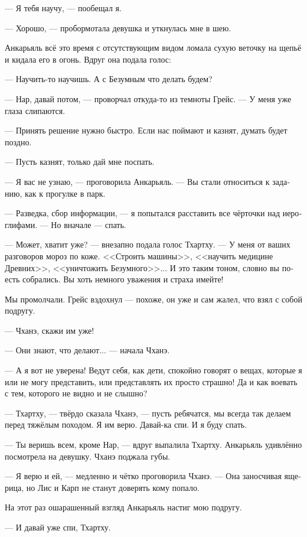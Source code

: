 \documentclass[a4paper,12pt,fleqn]{book}\usepackage{polyglossia}\setdefaultlanguage[babelshorthands=true]{russian}\setotherlanguage{english}\defaultfontfeatures{Ligatures=TeX,Mapping=tex-text}\usepackage{xcolor}\newcommand{\ml}[3]{#2}
\begin{document}
{--- Я тебя научу, --- пообещал я.

--- Хорошо, --- пробормотала девушка и уткнулась мне в шею.

Анкарьяль всё это время с отсутствующим видом ломала сухую веточку на щепьё и кидала его в огонь.
Вдруг она подала голос:

--- Научить-то научишь.
А с Безумным что делать будем?

--- Нар, давай потом, --- проворчал откуда-то из темноты Грейс.
--- У меня уже глаза слипаются.

--- Принять решение нужно быстро.
Если нас поймают и казнят, думать будет поздно.

--- Пусть казнят, только дай мне поспать.

--- Я вас не узнаю, --- проговорила Анкарьяль.
--- Вы стали относиться к заданию, как к прогулке в парк.

--- Разведка, сбор информации, --- я попытался расставить все чёрточки над иероглифами.
--- Но вначале --- спать.

--- Может, хватит уже? --- внезапно подала голос Тхартху.
--- У меня от ваших разговоров мороз по коже.
<<Строить машины>>, <<научить медицине Древних>>, <<уничтожить Безумного>>...
И это таким тоном, словно вы поесть собрались.
Вы хоть немного уважения и страха имейте!

Мы промолчали.
Грейс вздохнул --- похоже, он уже и сам жалел, что взял с собой подругу.

--- Чханэ, скажи им уже!

--- Они знают, что делают... --- начала Чханэ.

--- А я вот не уверена!
Ведут себя, как дети, спокойно говорят о вещах, которые я или не могу представить, или представлять их просто страшно!
Да и как воевать с тем, которого не видно и не слышно?

--- Тхартху, --- твёрдо сказала Чханэ, --- пусть ребячатся, мы всегда так делаем перед тяжёлым походом.
Я им верю.
Давай-ка спи.
И я буду спать.

--- Ты веришь всем, кроме Нар, --- вдруг выпалила Тхартху.
Анкарьяль удивлённо посмотрела на девушку.
Чханэ поджала губы.

--- Я верю и ей, --- медленно и чётко проговорила Чханэ.
--- Она заносчивая ящерица, но Лис и Карп не станут доверять кому попало.

На этот раз ошарашенный взгляд Анкарьяль настиг мою подругу.

--- И давай уже спи, Тхартху.

}
\end{document}
